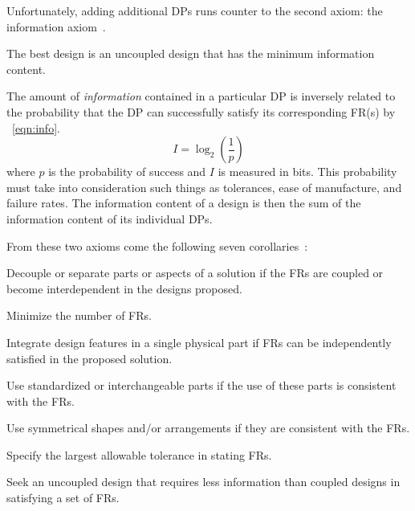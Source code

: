 Unfortunately, adding additional DPs runs counter to the second axiom: the information axiom~\cite{suh}.

\begin{axiom}
  The best design is an uncoupled design that has the minimum information content.
\end{axiom}

The amount of \emph{information} contained in a particular DP is inversely related to the probability that the DP
can successfully satisfy its corresponding FR(s) by \equationname~\ref{eqn:info}.
\begin{equation}
  \label{eqn:info}
  I=\log_2\left(\frac{1}{p}\right)
\end{equation}
where \(p\) is the probability of success and \(I\) is measured in bits.  This probability must take into
consideration such things as tolerances, ease of manufacture, and failure rates.  The information content of a
design is then the sum of the information content of its individual DPs.

From these two axioms come the following seven corollaries~\cite{suh}:
\begin{corollary}
  \label{cor:decouple}
  Decouple or separate parts or aspects of a solution if the FRs are coupled or become interdependent in the
  designs proposed.
\end{corollary}
\begin{corollary}
  \label{cor:minfrs}
  Minimize the number of FRs.
\end{corollary}
\begin{corollary}
  \label{cor:integrate}
  Integrate design features in a single physical part if FRs can be independently satisfied in the proposed
  solution.
\end{corollary}
\begin{corollary}
  \label{cor:standard}
  Use standardized or interchangeable parts if the use of these parts is consistent with the FRs.
\end{corollary}
\begin{corollary}
  \label{cor:shapes}
  Use symmetrical shapes and/or arrangements if they are consistent with the FRs.
\end{corollary}
\begin{corollary}
  \label{cor:tolerance}
  Specify the largest allowable tolerance in stating FRs.
\end{corollary}
\begin{corollary}
  \label{cor:uncoupled}
  Seek an uncoupled design that requires less information than coupled designs in satisfying a set of FRs.
\end{corollary}

